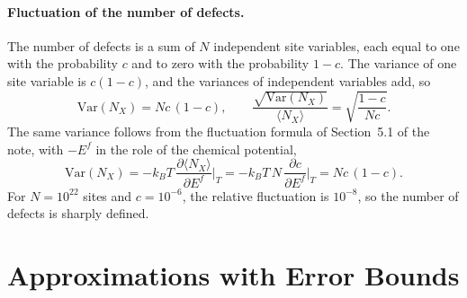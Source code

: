 \documentclass[11pt]{article}      %
\numberwithin{equation}{section}   %
\begin{document}
\paragraph{Fluctuation of the number of defects.}
The number of defects is a sum of $N$ independent site variables, each equal
to one with the probability $c$ and to zero with the probability $1-c$. The
variance of one site variable is $c(1-c)$, and the variances of independent
variables add, so
\begin{equation}
    \boxed{\mathrm{Var}(N_X)=Nc\,(1-c),
    \qquad
    \frac{\sqrt{\mathrm{Var}(N_X)}}{\langle N_X\rangle}
    =\sqrt{\frac{1-c}{Nc}}.}
    \label{eq:var}
\end{equation}
The same variance follows from the fluctuation formula of Section~5.1 of the
note, with $-E^f$ in the role of the chemical potential,
\begin{equation*}
    \mathrm{Var}(N_X)=-k_BT\,\frac{\partial\langle N_X\rangle}{\partial E^f}\bigg|_{T}
    =-k_BT\,N\,\frac{\partial c}{\partial E^f}\bigg|_{T}=Nc\,(1-c).
\end{equation*}
For $N=10^{22}$ sites and $c=10^{-6}$, the relative fluctuation is
$10^{-8}$, so the number of defects is sharply defined.

\section{Approximations with Error Bounds}
\end{document}
